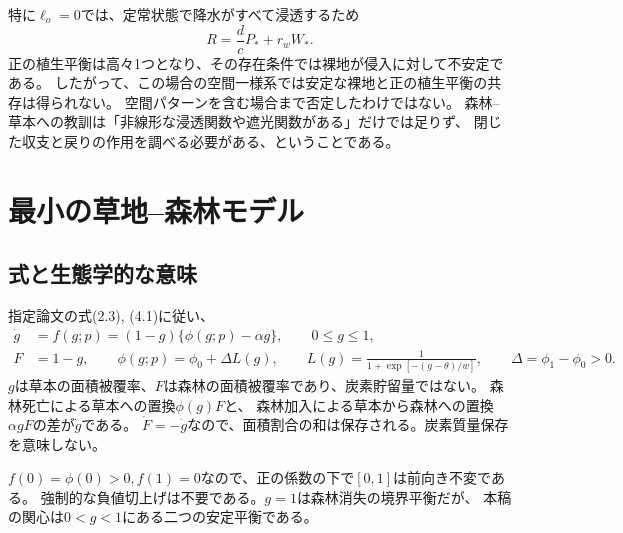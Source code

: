 \documentclass[a4paper,11pt]{ltjsarticle}
\begin{document}
特に$\ell_o=0$では、定常状態で降水がすべて浸透するため
\begin{equation}
 R=\frac dc P_*+r_wW_*.
\end{equation}
正の植生平衡は高々1つとなり、その存在条件では裸地が侵入に対して不安定である。
したがって、この場合の空間一様系では安定な裸地と正の植生平衡の共存は得られない。
空間パターンを含む場合まで否定したわけではない。
森林--草本への教訓は「非線形な浸透関数や遮光関数がある」だけでは足りず、
閉じた収支と戻りの作用を調べる必要がある、ということである。

\section{最小の草地--森林モデル}
\subsection{式と生態学的な意味}
指定論文\cite{kumar}の式(2.3), (4.1)に従い、
\begin{align}
 \dot g&=f(g;p)=(1-g)\{\phi(g;p)-\alpha g\},\qquad 0\le g\le1,\label{eq:model}\\
 F&=1-g,\qquad
 \phi(g;p)=\phi_0+\Delta L(g),\qquad
 L(g)=\frac{1}{1+\exp[-(g-\theta)/w]},\qquad
 \Delta=\phi_1-\phi_0>0.\label{eq:sigmoid}
\end{align}
$g$は草本の面積被覆率、$F$は森林の面積被覆率であり、炭素貯留量ではない。
森林死亡による草本への置換$\phi(g)F$と、
森林加入による草本から森林への置換$\alpha gF$の差が$\dot g$である。
$\dot F=-\dot g$なので、面積割合の和は保存される。炭素質量保存を意味しない。

$f(0)=\phi(0)>0,f(1)=0$なので、正の係数の下で$[0,1]$は前向き不変である。
強制的な負値切上げは不要である。$g=1$は森林消失の境界平衡だが、
本稿の関心は$0<g<1$にある二つの安定平衡である。
\end{document}
